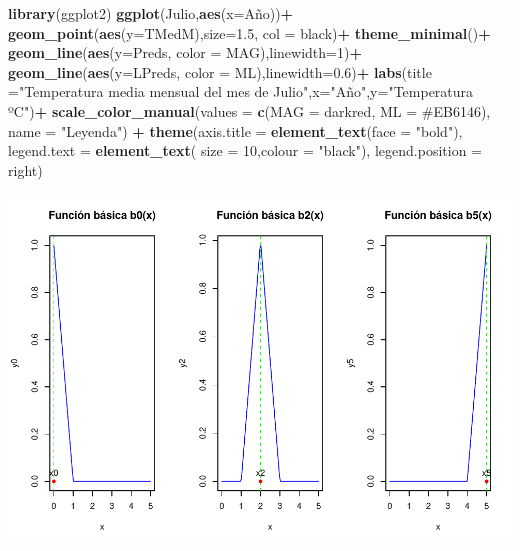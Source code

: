 \documentclass[12pt,a4paper,]{book}
\newenvironment{Shaded}{\begin{snugshade}}{\end{snugshade}}
\newcommand{\AttributeTok}[1]{\textcolor[rgb]{0.13,0.29,0.53}{#1}}
\newcommand{\DecValTok}[1]{\textcolor[rgb]{0.00,0.00,0.81}{#1}}
\newcommand{\FloatTok}[1]{\textcolor[rgb]{0.00,0.00,0.81}{#1}}
\newcommand{\FunctionTok}[1]{\textcolor[rgb]{0.13,0.29,0.53}{\textbf{#1}}}
\newcommand{\NormalTok}[1]{#1}
\newcommand{\OtherTok}[1]{\textcolor[rgb]{0.56,0.35,0.01}{#1}}
\newcommand{\SpecialCharTok}[1]{\textcolor[rgb]{0.81,0.36,0.00}{\textbf{#1}}}
\newcommand{\StringTok}[1]{\textcolor[rgb]{0.31,0.60,0.02}{#1}}
\numberwithin{dummy}{section}
\theoremstyle{ocrenumbox}
\theoremstyle{blacknumex}
\theoremstyle{blacknumbox}
\theoremstyle{ocrenum}
\theoremstyle{ocrenum}
\begin{document}
\begin{Shaded}
\begin{Highlighting}[]
\FunctionTok{library}\NormalTok{(ggplot2)}
\FunctionTok{ggplot}\NormalTok{(Julio,}\FunctionTok{aes}\NormalTok{(}\AttributeTok{x=}\NormalTok{Año))}\SpecialCharTok{+}
  \FunctionTok{geom\_point}\NormalTok{(}\FunctionTok{aes}\NormalTok{(}\AttributeTok{y=}\NormalTok{TMedM),}\AttributeTok{size=}\FloatTok{1.5}\NormalTok{, }\AttributeTok{col =} \StringTok{\textquotesingle{}black\textquotesingle{}}\NormalTok{)}\SpecialCharTok{+}
  \FunctionTok{theme\_minimal}\NormalTok{()}\SpecialCharTok{+}
  \FunctionTok{geom\_line}\NormalTok{(}\FunctionTok{aes}\NormalTok{(}\AttributeTok{y=}\NormalTok{Preds, }\AttributeTok{color =} \StringTok{\textquotesingle{}MAG\textquotesingle{}}\NormalTok{),}\AttributeTok{linewidth=}\DecValTok{1}\NormalTok{)}\SpecialCharTok{+}
  \FunctionTok{geom\_line}\NormalTok{(}\FunctionTok{aes}\NormalTok{(}\AttributeTok{y=}\NormalTok{LPreds, }\AttributeTok{color =} \StringTok{\textquotesingle{}ML\textquotesingle{}}\NormalTok{),}\AttributeTok{linewidth=}\FloatTok{0.6}\NormalTok{)}\SpecialCharTok{+}
  \FunctionTok{labs}\NormalTok{(}\AttributeTok{title =}\StringTok{"Temperatura media mensual del mes de Julio"}\NormalTok{,}\AttributeTok{x=}\StringTok{"Año"}\NormalTok{,}\AttributeTok{y=}\StringTok{"Temperatura ºC"}\NormalTok{)}\SpecialCharTok{+}
  \FunctionTok{scale\_color\_manual}\NormalTok{(}\AttributeTok{values =} \FunctionTok{c}\NormalTok{(}\StringTok{\textquotesingle{}MAG\textquotesingle{}} \OtherTok{=} \StringTok{\textquotesingle{}darkred\textquotesingle{}}\NormalTok{, }\StringTok{\textquotesingle{}ML\textquotesingle{}} \OtherTok{=} \StringTok{\textquotesingle{}\#EB6146\textquotesingle{}}\NormalTok{), }\AttributeTok{name =} \StringTok{"Leyenda"}\NormalTok{) }\SpecialCharTok{+} 
  \FunctionTok{theme}\NormalTok{(}\AttributeTok{axis.title =} \FunctionTok{element\_text}\NormalTok{(}\AttributeTok{face =} \StringTok{"bold"}\NormalTok{),}
        \AttributeTok{legend.text =} \FunctionTok{element\_text}\NormalTok{( }\AttributeTok{size =} \DecValTok{10}\NormalTok{,}\AttributeTok{colour =} \StringTok{"black"}\NormalTok{),}
        \AttributeTok{legend.position =} \StringTok{\textquotesingle{}right\textquotesingle{}}\NormalTok{)}
\end{Highlighting}
\end{Shaded}

\begin{center}\includegraphics[width=0.95\linewidth]{figurasR/unnamed-chunk-14-1} \end{center}
\end{document}
